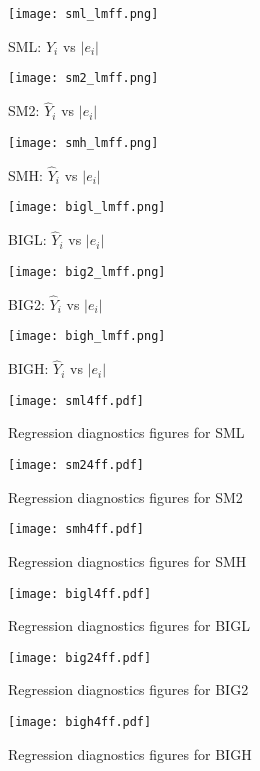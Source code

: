 \documentclass[11pt]{article}
\begin{document}
\begin{figure}
\centering
\texttt{[image: sml\_lmff.png]}
\caption{SML: $\hat{Y}_i$ vs $|e_i|$}
\label{smllmff}
\texttt{[image: sm2\_lmff.png]}
\caption{SM2: $\hat{Y}_i$ vs $|e_i|$}
\label{sm2lmff}
\end{figure}
\begin{figure}
\centering
\texttt{[image: smh\_lmff.png]}
\caption{SMH: $\hat{Y}_i$ vs $|e_i|$}
\label{smhlmff}
\texttt{[image: bigl\_lmff.png]}
\caption{BIGL: $\hat{Y}_i$ vs $|e_i|$}
\label{bigllmff}
\end{figure}
\begin{figure}
\centering
\texttt{[image: big2\_lmff.png]}
\caption{BIG2: $\hat{Y}_i$ vs $|e_i|$}
\label{big2lmff}
\texttt{[image: bigh\_lmff.png]}
\caption{BIGH: $\hat{Y}_i$ vs $|e_i|$}
\label{bighlmff}
\end{figure}


\begin{figure}
\centering
\texttt{[image: sml4ff.pdf]}
\caption{Regression diagnostics figures for SML }
\label{sml4ff}
\end{figure}
\begin{figure}
\texttt{[image: sm24ff.pdf]}
\caption{Regression diagnostics figures for SM2}
\label{sm24ff}
\end{figure}
\begin{figure}
\centering
\texttt{[image: smh4ff.pdf]}
\caption{Regression diagnostics figures for SMH}
\label{smh4ff}
\end{figure}
\begin{figure}
\texttt{[image: bigl4ff.pdf]}
\caption{Regression diagnostics figures for BIGL}
\label{bigl4ff}
\end{figure}
\begin{figure}
\centering
\texttt{[image: big24ff.pdf]}
\caption{Regression diagnostics figures for BIG2}
\label{big24ff}
\end{figure}
\begin{figure}
\texttt{[image: bigh4ff.pdf]}
\caption{Regression diagnostics figures for BIGH}
\label{bigh4ff}
\end{figure}
\end{document}
